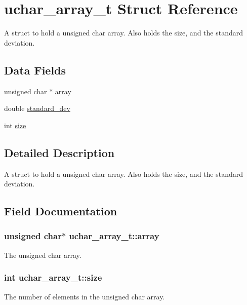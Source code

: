 \hypertarget{structuchar__array__t}{}\section{uchar\+\_\+array\+\_\+t Struct Reference}
\label{structuchar__array__t}


A struct to hold a unsigned char array. Also holds the size, and the standard deviation.  


\subsection*{Data Fields}
\begin{DoxyCompactItemize}
\item 
unsigned char $\ast$ \hyperlink{structuchar__array__t_a76655383d2ec294a6eb01685b3a72703}{array}
\item 
double \hyperlink{structuchar__array__t_a6debbe8b5be99042683abaae9961c91d}{standard\+\_\+dev}
\item 
int \hyperlink{structuchar__array__t_a7295f3a1d13730521639d49098861c60}{size}
\end{DoxyCompactItemize}


\subsection{Detailed Description}
A struct to hold a unsigned char array. Also holds the size, and the standard deviation. 

\subsection{Field Documentation}
\subsubsection[{\texorpdfstring{array}{array}}]{\setlength{\rightskip}{0pt plus 5cm}unsigned char$\ast$ uchar\+\_\+array\+\_\+t\+::array}\hypertarget{structuchar__array__t_a76655383d2ec294a6eb01685b3a72703}{}\label{structuchar__array__t_a76655383d2ec294a6eb01685b3a72703}
The unsigned char array. 
\subsubsection[{\texorpdfstring{size}{size}}]{\setlength{\rightskip}{0pt plus 5cm}int uchar\+\_\+array\+\_\+t\+::size}\hypertarget{structuchar__array__t_a7295f3a1d13730521639d49098861c60}{}\label{structuchar__array__t_a7295f3a1d13730521639d49098861c60}
The number of elements in the unsigned char array. 
